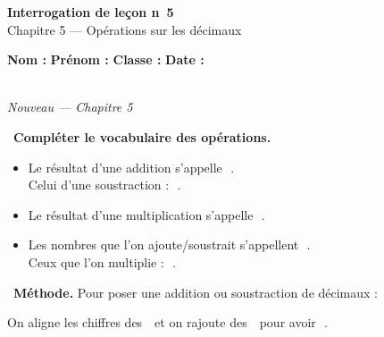 \documentclass[a4paper,11pt]{article}
\newcommand{\bl}[1][4cm]{\,\makebox[#1]{\dotfill}\,}
\newcommand{\coeur}{\textcolor{Couleur8}{\faHeart}\ }
\begin{document}
\begin{mdframed}[linecolor=Couleur1,linewidth=2pt,topline=true,bottomline=true,leftline=false,rightline=false,innertopmargin=8pt,innerbottommargin=8pt,backgroundcolor=Couleur1!5]
\begin{center}
{\Large\bfseries\textcolor{Couleur1}{Interrogation de le\c{c}on n\degre~5}}\\[4pt]
{\large\textcolor{Couleur8}{Chapitre 5 --- Op\'erations sur les d\'ecimaux}}
\end{center}
\end{mdframed}
\vspace{0.4cm}
\noindent\textbf{Nom :} \dotfill\quad\textbf{Pr\'enom :} \dotfill\quad\textbf{Classe :} \dotfill\quad\textbf{Date :} \dotfill
\vspace{0.5cm}

\vspace{0.3cm}
\noindent{\textcolor{Couleur8}{\rule{\textwidth}{0.5pt}}}\\
{\small\textit{\textcolor{Couleur8}{Nouveau --- Chapitre 5}}}
\vspace{0.1cm}

\noindent \coeur \textbf{Compl\'eter le vocabulaire des op\'erations.}
\begin{mdframed}[linecolor=Couleur6,linewidth=4pt,topline=false,bottomline=false,rightline=false,backgroundcolor=Couleur6!10,innerleftmargin=8pt,innertopmargin=6pt,innerbottommargin=6pt]
\begin{itemize}[label=\textcolor{Couleur6}{$\bullet$},nosep,itemsep=4pt]
\item Le r\'esultat d'une addition s'appelle \bl[4cm]. \\
Celui d'une soustraction : \bl[4cm].
\item Le r\'esultat d'une multiplication s'appelle \bl[4cm].
\item Les nombres que l'on ajoute/soustrait s'appellent \bl[4cm].\\
 Ceux que l'on multiplie : \bl[4cm].
\end{itemize}
\end{mdframed}

\noindent \coeur \textbf{M\'ethode.} Pour poser une addition ou soustraction de d\'ecimaux :
\begin{mdframed}[linecolor=Couleur1,linewidth=4pt,topline=false,bottomline=false,rightline=false,backgroundcolor=Couleur1!5,innerleftmargin=8pt,innertopmargin=6pt,innerbottommargin=6pt]
On aligne les chiffres des \bl[3cm] et on rajoute des \bl[1cm] pour avoir \bl[6cm].
\end{mdframed}
\end{document}

